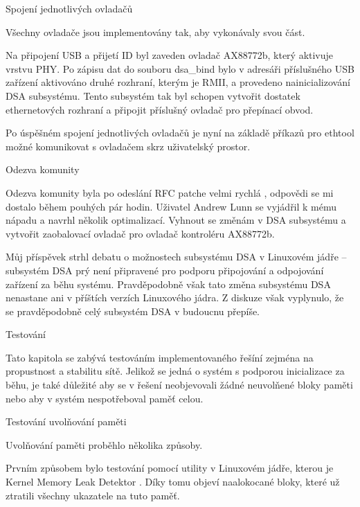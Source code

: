 \sec Spojení jednotlivých ovladačů


Všechny ovladače jsou implementovány tak, aby vykonávaly svou část.

Na připojení USB a přijetí ID byl zaveden ovladač AX88772b, který aktivuje vrstvu PHY. 
Po zápisu dat do souboru dsa\_bind bylo v adresáři příslušného USB zařízení aktivováno druhé rozhraní, kterým je RMII, a provedeno nainicializování DSA subsystému.
Tento subsystém tak byl schopen vytvořit dostatek ethernetových rozhraní a připojit příslušný ovladač pro přepínací obvod.

Po úspěšném spojení jednotlivých ovladačů je nyní na základě příkazů pro ethtool možné komunikovat s ovladačem skrz uživatelský prostor.

\sec Odezva komunity

Odezva komunity byla po odeslání RFC patche velmi rychlá
,
odpovědi se mi dostalo během pouhých pár hodin.
Uživatel Andrew Lunn se vyjádřil k mému nápadu a navrhl několik optimalizací.
Vyhnout se změnám v DSA subsystému a vytvořit zaobalovací ovladač pro ovladač kontroléru AX88772b.

Můj příspěvek strhl debatu o možnostech subsystému DSA v Linuxovém jádře -- subsystém DSA prý není připravené pro podporu připojování a odpojování zařízení za běhu systému.
Pravděpodobně však tato změna subsystému DSA nenastane ani v příštích verzích Linuxového jádra.
Z diskuze však vyplynulo, že se pravděpodobně celý subsystém DSA v budoucnu přepíše.

\chap Testování

Tato kapitola se zabývá testováním implementovaného řešíní zejména na propustnost a stabilitu sítě.
Jelikož se jedná o systém s podporou inicializace za běhu, je také důležité aby se v řešení neobjevovali žádné neuvolňené bloky paměti nebo aby v systém nespotřeboval paměť celou.

\sec Testování uvolňování paměti

Uvolňování paměti proběhlo několika způsoby.

Prvním způsobem bylo testování pomocí utility v Linuxovém jádře, kterou je Kernel Memory Leak Detektor
.
Díky tomu objeví naalokocané bloky, které už ztratili všechny ukazatele na tuto paměť.


